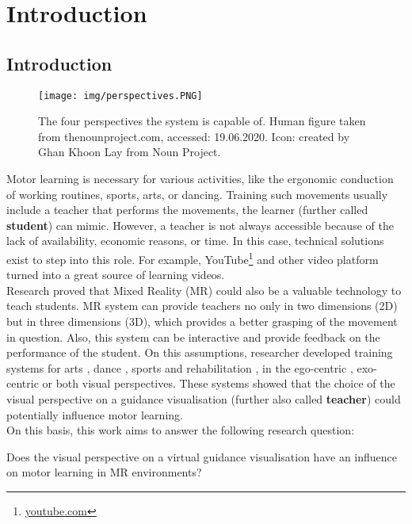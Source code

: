 \chapter{Introduction}

\section{Introduction}
\begin{figure}
	\centering
	\texttt{[image: img/perspectives.PNG]}
	\caption{The four perspectives the system is capable of. Human figure taken from thenounproject.com, accessed: 19.06.2020. Icon: created by Ghan Khoon Lay from Noun Project.}
	\label{fig:perspectives}
\end{figure}
Motor learning is necessary for various activities, like the ergonomic conduction of working routines, sports, arts, or dancing. Training such movements usually include a teacher that performs the movements, the learner (further called \textbf{student}) can mimic. However, a teacher is not always accessible because of the lack of availability, economic reasons, or time. In this case, technical solutions exist to step into this role. For example, YouTube\footnote{\href{https://www.youtube.com/}{youtube.com}} and other video platform turned into a great source of learning videos.\\
Research proved that Mixed Reality (MR) could also be a valuable technology to teach students. MR system can provide teachers no only in two dimensions (2D) but in three dimensions (3D), which provides a better grasping of the movement in question. Also, this system can be interactive and provide feedback on the performance of the student. On this assumptions, researcher developed training systems for arts \cite{Han2016, Komura2006, Chua}, dance \cite{Yan2015, Chan2010, Hachimura2004}, sports \cite{Covaci2014, Kojima2014} and rehabilitation \cite{Chinthammit2014, Tang2015, Rajanna2015}, in the ego-centric \cite{Yang2002, Katzakis2017, Scavo2015}, exo-centric \cite{Han2017, Velloso2013, Lieberman2007} or both \cite{Sousa2016, Hoang2016, Sodhi2012} visual perspectives. These systems showed that the choice of the visual perspective on a guidance visualisation (further also called \textbf{teacher}) could potentially influence motor learning.\\
On this basis, this work aims to answer the following research question:
\begin{tcolorbox}[colback=red!30!white]
	Does the visual perspective on a virtual guidance visualisation have an influence on motor learning in MR environments?
\end{tcolorbox}
